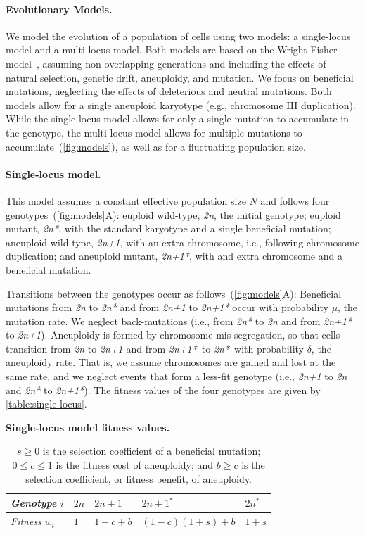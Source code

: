 \documentclass[12pt]{extarticle}
\newcommand{\euwt}{\emph{2n}}
\newcommand{\anwt}{\emph{2n+1}}
\newcommand{\eumt}{\emph{2n*}}
\newcommand{\anmt}{\emph{2n+1*}}
\begin{document}
\paragraph*{Evolutionary Models.}
We model the evolution of a population of cells using two models: a single-locus model and a multi-locus model.
Both models are based on the Wright-Fisher model~\citep{Otto2007}, assuming non-overlapping generations and including the effects of natural selection, genetic drift, aneuploidy, and mutation. 
We focus on beneficial mutations, neglecting the effects of deleterious and neutral mutations. Both models allow for a single aneuploid karyotype (e.g., chromosome III duplication).
While the single-locus model allows for only a single mutation to accumulate in the genotype, the multi-locus model allows for multiple mutations to accumulate~(\autoref{fig:models}), as well as for a fluctuating population size.

\paragraph*{Single-locus model.}
This model assumes a constant effective population size $N$ and follows four genotypes~(\autoref{fig:models}A): euploid wild-type, \euwt, the initial genotype; 
euploid mutant, \eumt, with the standard karyotype and a single beneficial mutation; 
aneuploid wild-type, \anwt, with an extra chromosome, i.e., following chromosome duplication; and
aneuploid mutant, \anmt, with and extra chromosome and a beneficial mutation. 

Transitions between the genotypes occur as follows~(\autoref{fig:models}A): Beneficial mutations from \euwt\; to \eumt\; and from \anwt\; to \anmt\; occur with probability $\mu$, the mutation rate. We neglect back-mutations (i.e., from \eumt\; to \euwt\; and from \anmt\; to \anwt).
Aneuploidy is formed by chromosome mis-segregation, so that cells transition from \euwt\; to \anwt\; and from \anmt\ to \eumt\ with probability $\delta$, the aneuploidy rate. That is, we assume chromosomes are gained and lost at the same rate, and we neglect events that form a less-fit genotype (i.e., \anwt\; to \euwt\; and \eumt\; to \anmt).
The fitness values of the four genotypes are given by \autoref{table:single-locus}.

\begin{table}[h]
\centering
\caption{\textbf{Single-locus model fitness values.}}
\begin{tabular}{lllll}
\emph{Genotype} $i$ & $2n$ & $2n+1$ & $2n+1^*$ & $2n^*$ \\
\hline
\emph{Fitness} $w_i$ & $1$ & $1-c+b$ & $(1-c)(1+s)+b$ & $1+s$               
\end{tabular}
\label{table:single-locus}
\caption*{
$s \ge 0$ is the selection coefficient of a beneficial mutation;
$0 \le c \le 1$ is the fitness cost of aneuploidy;
and $b \ge c$ is the selection coefficient, or fitness benefit, of aneuploidy.
}
\end{table}
\end{document}
